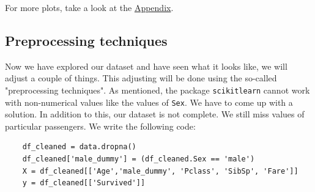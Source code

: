\documentclass[11pt]{article}
\begin{document}
For more plots, take a look at the \hyperref[sec:appendix]{Appendix}. 



\subsection{Preprocessing techniques}
\label{sec:org1e15687}

Now we have explored our dataset and have seen what it looks like, we will adjust a couple of things. This adjusting will be done using the so-called "preprocessing techniques". As mentioned, the package \texttt{scikitlearn} cannot work with non-numerical values like the values of \texttt{Sex}. We have to come up with a solution. In addition to this, our dataset is not complete. We still miss values of particular passengers. We write the following code:

\begin{verbatim}
    df_cleaned = data.dropna()
    df_cleaned['male_dummy'] = (df_cleaned.Sex == 'male') 
    X = df_cleaned[['Age','male_dummy', 'Pclass', 'SibSp', 'Fare']]
    y = df_cleaned[['Survived']]
\end{verbatim}
\end{document}
